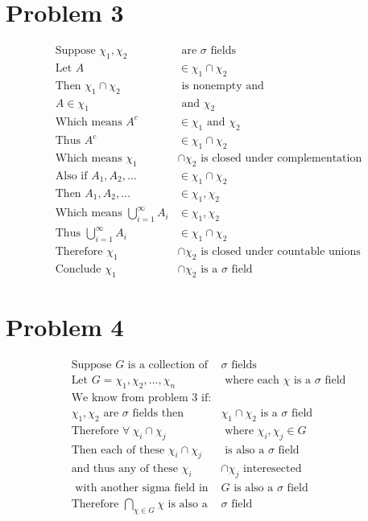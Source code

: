 \documentclass{article}
\begin{document}
\begin{flushleft}
\section*{Problem 3}
\begin{align*}
\text{Suppose } \chi_1, \chi_2 &\text{ are } \sigma \text{ fields}\\
\text{Let } A&\in \chi_1 \cap \chi_2\\
\text{Then } \chi_1 \cap \chi_2& \text{ is nonempty and }\\
A \in \chi_1 &\text{ and } \chi_2\\
\text{Which means } A^c &\in \chi_1 \text{ and } \chi_2\\
\text{Thus } A^c &\in \chi_1 \cap \chi_2\\
\text{Which means } \chi_1 &\cap \chi_2 \text{ is closed under complementation}\\
\text{Also if } A_1,A_2,\dots &\in \chi_1 \cap \chi_2\\
\text{Then } A_1,A_2,\dots &\in \chi_1, \chi_2\\
\text{Which means } \bigcup \limits_{i=1}^{\infty}A_i &\in \chi_1, \chi_2\\
\text{Thus } \bigcup \limits_{i=1}^{\infty}A_i &\in \chi_1 \cap \chi_2\\
\text{Therefore }  \chi_1 &\cap \chi_2 \text{ is closed under countable unions}\\
\text{Conclude } \chi_1 &\cap \chi_2 \text{ is a } \sigma \text{ field}
\end{align*}
\section*{Problem 4}
\begin{align*}
\text{Suppose } G \text{ is a collection of } &\sigma \text{ fields}\\
\text{Let } G=\chi_1,\chi_2,\dots,\chi_n &\text{ where each } \chi \text{ is a } \sigma \text{ field}\\
\text{We know from problem 3 if:}&\\ \chi_1, \chi_2 \text{ are } \sigma \text{ fields then }& \chi_1 \cap \chi_2 \text{ is a } \sigma \text{ field}\\
\text{Therefore } \forall \ \chi_i \cap \chi_j& \text{ where } \chi_i, \chi_j \in G\\
\text{Then each of these } \chi_i \cap \chi_j &\text{ is also a } \sigma \text{ field}\\
\text{and thus any of these } \chi_i &\cap \chi_j  \text{ interesected}\\
\text{ with another sigma field in } &G \text{ is also a } \sigma \text{ field}\\
\text{Therefore } \bigcap_{\chi \in G} \chi \text{ is also a } &\sigma 
\text{ field}
\end{align*}
\pagebreak

\end{flushleft}
\end{document}
